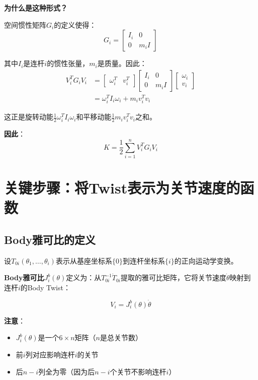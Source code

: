 \documentclass[12pt,a4paper]{article}
\begin{document}
\textbf{为什么是这种形式？}

空间惯性矩阵$G_i$的定义使得：
\begin{equation}
G_i = \begin{bmatrix} I_i & 0 \\ 0 & m_i I \end{bmatrix}
\end{equation}

其中$I_i$是连杆$i$的惯性张量，$m_i$是质量。因此：
\begin{align}
V_i^T G_i V_i &= \begin{bmatrix} \omega_i^T & v_i^T \end{bmatrix} \begin{bmatrix} I_i & 0 \\ 0 & m_i I \end{bmatrix} \begin{bmatrix} \omega_i \\ v_i \end{bmatrix} \\
&= \omega_i^T I_i \omega_i + m_i v_i^T v_i
\end{align}

这正是旋转动能$\frac{1}{2}\omega_i^T I_i \omega_i$和平移动能$\frac{1}{2}m_i v_i^T v_i$之和。

\textbf{因此}：
\begin{equation}
K = \frac{1}{2}\sum_{i=1}^{n} V_i^T G_i V_i
\label{eq:kinetic_energy_sum}
\end{equation}

\section{关键步骤：将Twist表示为关节速度的函数}

\subsection{Body雅可比的定义}

设$T_{0i}(\theta_1, \ldots, \theta_i)$表示从基座坐标系$\{0\}$到连杆坐标系$\{i\}$的正向运动学变换。

\textbf{Body雅可比}$J_i^b(\theta)$定义为：从$T_{0i}^{-1}\dot{T}_{0i}$提取的雅可比矩阵，它将关节速度$\dot{\theta}$映射到连杆$i$的Body Twist：

\begin{equation}
V_i = J_i^b(\theta) \dot{\theta}
\label{eq:body_jacobian}
\end{equation}

\textbf{注意}：
\begin{itemize}
\item $J_i^b(\theta)$是一个$6 \times n$矩阵（$n$是总关节数）
\item 前$i$列对应影响连杆$i$的关节
\item 后$n-i$列全为零（因为后$n-i$个关节不影响连杆$i$）
\end{itemize}
\end{document}
